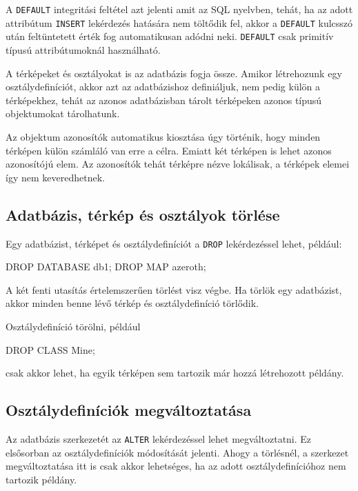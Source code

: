 A \texttt{DEFAULT} integritási feltétel azt jelenti amit az SQL nyelvben, tehát, ha az adott attribútum \texttt{INSERT} lekérdezés hatására nem töltődik fel, akkor a \texttt{DEFAULT} kulcsszó után feltüntetett érték fog automatikusan adódni neki. \texttt{DEFAULT} csak primitív típusú attribútumoknál használható.

A térképeket és osztályokat is az adatbázis fogja össze. Amikor létrehozunk egy osztálydefiníciót, akkor azt az adatbázishoz definiáljuk, nem pedig külön a térképekhez, tehát az azonos adatbázisban tárolt térképeken azonos típusú objektumokat tárolhatunk.

Az objektum azonosítók automatikus kiosztása úgy történik, hogy minden térképen külön számláló van erre a célra. Emiatt két térképen is lehet azonos azonosítójú elem. Az azonosítók tehát térképre nézve lokálisak, a térképek elemei így nem keveredhetnek.

\subsection{Adatbázis, térkép és osztályok törlése}

Egy adatbázist, térképet és osztálydefiníciót a \texttt{DROP} lekérdezéssel lehet, például:
\begin{sql}
DROP DATABASE db1;
DROP MAP azeroth;
\end{sql}
A két fenti utasítás értelemszerűen törlést visz végbe. Ha törlök egy adatbázist, akkor minden benne lévő térkép és osztálydefiníció törlődik.

Osztálydefiníció törölni, például
\begin{sql}
DROP CLASS Mine;
\end{sql}
csak akkor lehet, ha egyik térképen sem tartozik már hozzá létrehozott példány.

\subsection{Osztálydefiníciók megváltoztatása}

Az adatbázis szerkezetét az \texttt{ALTER} lekérdezéssel lehet megváltoztatni. Ez elsősorban az osztálydefiníciók módosítását jelenti. Ahogy a törlésnél, a szerkezet megváltoztatása itt is csak akkor lehetséges, ha az adott osztálydefinícióhoz nem tartozik példány.

